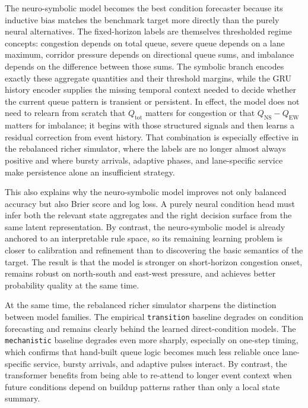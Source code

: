 \documentclass[11pt]{article}
\begin{document}
The neuro-symbolic model becomes the best condition forecaster because its inductive bias matches the benchmark target more directly than the purely neural alternatives. The fixed-horizon labels are themselves thresholded regime concepts: congestion depends on total queue, severe queue depends on a lane maximum, corridor pressure depends on directional queue sums, and imbalance depends on the difference between those sums. The symbolic branch encodes exactly these aggregate quantities and their threshold margins, while the GRU history encoder supplies the missing temporal context needed to decide whether the current queue pattern is transient or persistent. In effect, the model does not need to relearn from scratch that \(Q_{\mathrm{tot}}\) matters for congestion or that \(Q_{\mathrm{NS}} - Q_{\mathrm{EW}}\) matters for imbalance; it begins with those structured signals and then learns a residual correction from event history. That combination is especially effective in the rebalanced richer simulator, where the labels are no longer almost always positive and where bursty arrivals, adaptive phases, and lane-specific service make persistence alone an insufficient strategy.

This also explains why the neuro-symbolic model improves not only balanced accuracy but also Brier score and log loss. A purely neural condition head must infer both the relevant state aggregates and the right decision surface from the same latent representation. By contrast, the neuro-symbolic model is already anchored to an interpretable rule space, so its remaining learning problem is closer to calibration and refinement than to discovering the basic semantics of the target. The result is that the model is stronger on short-horizon congestion onset, remains robust on north-south and east-west pressure, and achieves better probability quality at the same time.

At the same time, the rebalanced richer simulator sharpens the distinction between model families. The empirical \texttt{transition} baseline degrades on condition forecasting and remains clearly behind the learned direct-condition models. The \texttt{mechanistic} baseline degrades even more sharply, especially on one-step timing, which confirms that hand-built queue logic becomes much less reliable once lane-specific service, bursty arrivals, and adaptive pulses interact. By contrast, the transformer benefits from being able to re-attend to longer event context when future conditions depend on buildup patterns rather than only a local state summary.
\end{document}
